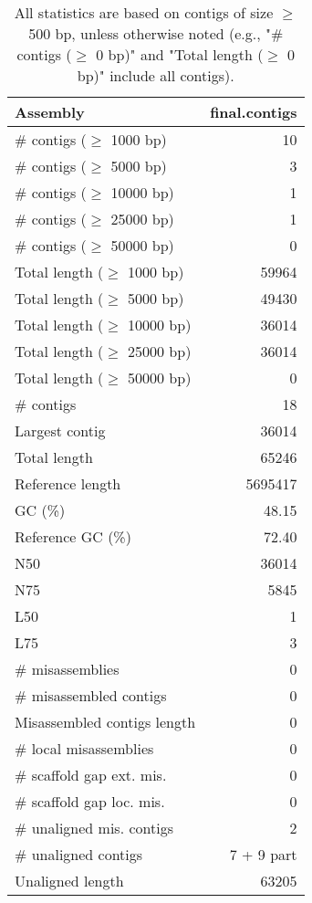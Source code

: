 \documentclass[12pt,a4paper]{article}
\begin{document}
\begin{table}[ht]
\begin{center}
\caption{All statistics are based on contigs of size $\geq$ 500 bp, unless otherwise noted (e.g., "\# contigs ($\geq$ 0 bp)" and "Total length ($\geq$ 0 bp)" include all contigs).}
\begin{tabular}{|l*{1}{|r}|}
\hline
Assembly & final.contigs \\ \hline
\# contigs ($\geq$ 1000 bp) & 10 \\ \hline
\# contigs ($\geq$ 5000 bp) & 3 \\ \hline
\# contigs ($\geq$ 10000 bp) & 1 \\ \hline
\# contigs ($\geq$ 25000 bp) & 1 \\ \hline
\# contigs ($\geq$ 50000 bp) & 0 \\ \hline
Total length ($\geq$ 1000 bp) & 59964 \\ \hline
Total length ($\geq$ 5000 bp) & 49430 \\ \hline
Total length ($\geq$ 10000 bp) & 36014 \\ \hline
Total length ($\geq$ 25000 bp) & 36014 \\ \hline
Total length ($\geq$ 50000 bp) & 0 \\ \hline
\# contigs & 18 \\ \hline
Largest contig & 36014 \\ \hline
Total length & 65246 \\ \hline
Reference length & 5695417 \\ \hline
GC (\%) & 48.15 \\ \hline
Reference GC (\%) & 72.40 \\ \hline
N50 & 36014 \\ \hline
N75 & 5845 \\ \hline
L50 & 1 \\ \hline
L75 & 3 \\ \hline
\# misassemblies & 0 \\ \hline
\# misassembled contigs & 0 \\ \hline
Misassembled contigs length & 0 \\ \hline
\# local misassemblies & 0 \\ \hline
\# scaffold gap ext. mis. & 0 \\ \hline
\# scaffold gap loc. mis. & 0 \\ \hline
\# unaligned mis. contigs & 2 \\ \hline
\# unaligned contigs & 7 + 9 part \\ \hline
Unaligned length & 63205 \\ \hline

\end{tabular}
\end{center}
\end{table}
\end{document}
